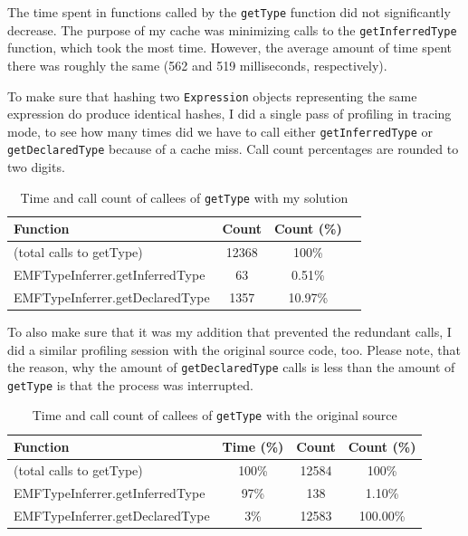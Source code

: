 \documentclass[11pt,a4paper,oneside]{report}
\begin{document}
The time spent in functions called by the \texttt{getType} function did not
significantly decrease. The purpose of my cache was minimizing calls to the
\texttt{getInferredType} function, which took the most time. However, the
average amount of time spent there was roughly the same (562 and 519
milliseconds, respectively).

To make sure that hashing two \texttt{Expression} objects representing the same
expression do produce identical hashes, I did a single pass of profiling in
tracing mode, to see how many times did we have to call either
\texttt{getInferredType} or \texttt{getDeclaredType} because of a cache miss.
Call count percentages are rounded to two digits.

\begin{table}[ht]
    \footnotesize
    \centering
    \begin{tabular}{ l c c c }
        \toprule
        Function & Count & Count (\%) \\
        \midrule
        (total calls to getType) & 12368 & 100\% \\
        EMFTypeInferrer.getInferredType & 63 & 0.51\% \\
        EMFTypeInferrer.getDeclaredType & 1357 & 10.97\% \\
        \bottomrule
    \end{tabular}
    \caption{Time and call count of callees of \texttt{getType} with my solution}
    \label{tab:first-solution-call-counts}
\end{table}

To also make sure that it was my addition that prevented the redundant calls, I
did a similar profiling session with the original source code, too. Please note,
that the reason, why the amount of \texttt{getDeclaredType} calls is less than
the amount of \texttt{getType} is that the process was interrupted.

\begin{table}[ht]
    \footnotesize
    \centering
    \begin{tabular}{ l c c c }
        \toprule
        Function & Time (\%) & Count & Count (\%) \\
        \midrule
        (total calls to getType) & 100\% & 12584 & 100\% \\
        EMFTypeInferrer.getInferredType & 97\% & 138 & 1.10\% \\
        EMFTypeInferrer.getDeclaredType & 3\% & 12583 & 100.00\% \\
        \bottomrule
    \end{tabular}
    \caption{Time and call count of callees of \texttt{getType} with the original source}
    \label{tab:first-solution-call-counts}
\end{table}
\end{document}
